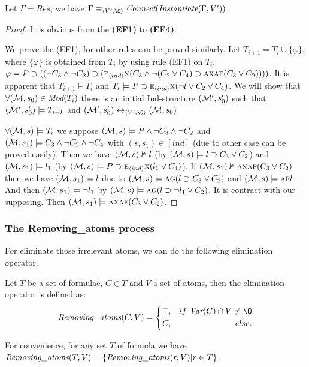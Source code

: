 \documentclass[letterpaper]{article} %
\begin{document}
\begin{proposition} \label{pro:EF}
Let $\Gamma=Res$, we have $\Gamma \equiv_{\tuple{V', {\O}}}\emph{Connect}(\emph{Instantiate}(\Gamma, V'))$.
\end{proposition}
\begin{proof}
It is obvious from the  \textbf{(EF1)} to \textbf{(EF4)}.

We prove the (EF1), for other rules can be proved similarly.
Let $T_{i+1}=T_i \cup \{\varphi\}$, where $\{\varphi\}$ is obtained from $T_i$ by using rule (EF1) on $T_i$, \ie $\varphi =P \supset ((\neg C_3 \wedge \neg C_2) \supset  (\textsc{e}_{{\langle{ind}\rangle}}\textsc{x}(C_3 \wedge \neg (C_2 \vee C_4) \supset \textsc{a}\textsc{x} \textsc{a}\textsc{f}(C_3 \vee C_2))))$.
It is apparent that $T_{i+1} \models T_i$ and $T_i \models P\supset \textsc{e}_{{\langle{ind}\rangle}}\textsc{x} (\neg l \vee C_2 \vee C_4)$.
We will show that $\forall ({\cal M}, s_0) \in \textit{Mod}(T_i)$ there is an initial Ind-structure $({\cal M}',s_0')$ such that $({\cal M}',s_0') \models T_{i+1}$ and $(\Hm',s_0') \lrto_{\tuple{V', {\O}}} (\Hm, s_0)$

$\forall ({\cal M}, s) \models T_i$ we suppose $({\cal M}, s) \models P \wedge \neg C_3 \wedge \neg C_2$ and $({\cal M}, s_1)\models C_3 \wedge \neg C_2 \wedge \neg C_4$ with $(s, s_1) \in [ind]$ (due to other case can be proved easily).
Then we have $({\cal M}, s) \nvDash l$ (by $({\cal M}, s) \models l \supset C_3 \vee C_2$) and $({\cal M},s_1) \models l_1$ (by $({\cal M}, s) \models P\supset \textsc{e}_{{\langle{ind}\rangle}}\textsc{x} (l_1 \vee C_4)$).
If $({\cal M},s_1) \nvDash \textsc{a}\textsc{x} \textsc{a}\textsc{f}(C_3 \vee C_2)$ then we have $({\cal M}, s_1) \models l$ due to $({\cal M}, s) \models \textsc{a}\textsc{g}(l\supset C_3 \vee C_2)$ and $({\cal M}, s)\models \textsc{a}\textsc{f} l$.
And then $({\cal M}, s_1) \models \neg l_1$ by $({\cal M},s) \models \textsc{a} \textsc{g}(l\supset \neg l_1 \vee C_2)$.
It is contract with our supposing.
Then $({\cal M},s_1) \models \textsc{a}\textsc{x} \textsc{a}\textsc{f}(C_3 \vee C_2)$.


\end{proof}


\subsubsection{The Removing\_atoms process}
For eliminate those irrelevant atoms, we can do the following elimination operator.
\begin{definition}\label{def:Elm}
Let $T$ be a set of formulae, $C \in T$ and $V$ a set of atoms, then the elimination operator is defined as:
$$ \emph{Removing\_atoms}(C, V)=\left\{
\begin{aligned}
\top, && if\ \Var(C) \cap V \neq {\O} \\
C, && else.
\end{aligned}
\right.
$$
\end{definition}
For convenience, for any set $T$ of formula we have $\emph{Removing\_atoms}(T, V) = \{\emph{Removing\_atoms}(r, V) | r \in T\}$.
\end{document}
